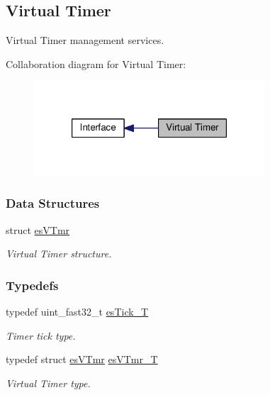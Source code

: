 \hypertarget{group__kern__vtmr}{\subsection{Virtual Timer}
\label{group__kern__vtmr}
}


Virtual Timer management services.  


Collaboration diagram for Virtual Timer\-:\nopagebreak
\begin{figure}[H]
\begin{center}
\leavevmode
\includegraphics[width=244pt]{group__kern__vtmr}
\end{center}
\end{figure}
\subsubsection*{Data Structures}
\begin{DoxyCompactItemize}
\item 
struct \hyperlink{structesVTmr}{es\-V\-Tmr}
\begin{DoxyCompactList}\small\item\em Virtual Timer structure. \end{DoxyCompactList}\end{DoxyCompactItemize}
\subsubsection*{Typedefs}
\begin{DoxyCompactItemize}
\item 
typedef uint\-\_\-fast32\-\_\-t \hyperlink{group__kern__vtmr_ga844873888c186ee81eb66620dadb0451}{es\-Tick\-\_\-\-T}
\begin{DoxyCompactList}\small\item\em Timer tick type. \end{DoxyCompactList}\item 
typedef struct \hyperlink{structesVTmr}{es\-V\-Tmr} \hyperlink{group__kern__vtmr_ga3c020f0ca54ff412bc1d1505502d2afc}{es\-V\-Tmr\-\_\-\-T}
\begin{DoxyCompactList}\small\item\em Virtual Timer type. \end{DoxyCompactList}\end{DoxyCompactItemize}
